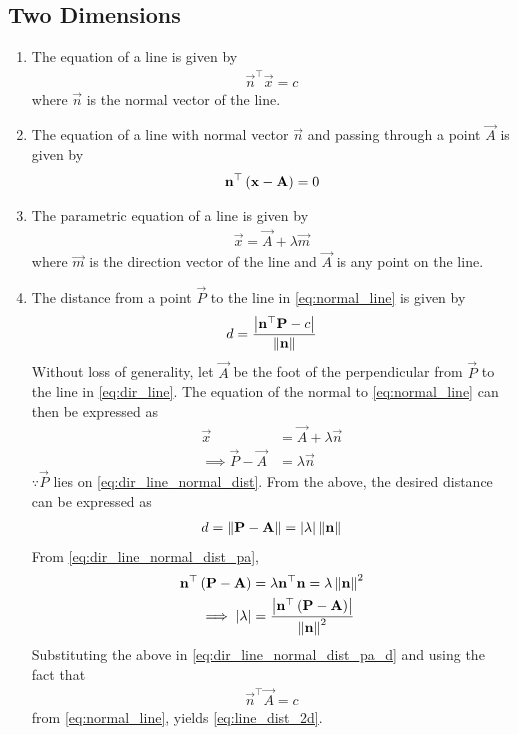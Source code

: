 \documentclass[journal,12pt,twocolumn]{IEEEtran}
\renewcommand\thesection{\arabic{section}}
\renewcommand\thesubsection{\thesection.\arabic{subsection}}
\begin{document}
\subsection{Two Dimensions}
\renewcommand{\theequation}{\theenumi}
\begin{enumerate}[label=\thesubsection.\arabic*.,ref=\thesubsection.\theenumi]
\item The equation of a line  is given by  
\begin{align}
	\label{eq:normal_line}
   \vec{n}^{\top}\vec{x} = c
\end{align}
		where $\vec{n}$ is the normal vector of the line.
	\item The equation of a line with normal vector $\vec{n}$ and passing through a point $\vec{A}$ 
		is given by 
\begin{align}
	\label{eq:normal_line_pt}
	\mathbf{n}^{\top}\left(\mathbf{x}-\mathbf{A}\right) =0 
\end{align}
\item The parametric equation of a line  is given by  
\begin{align}
	\label{eq:dir_line}
	\vec{x} = \vec{A} + \lambda \vec{m}
\end{align}
		where $\vec{m}$ is the direction vector of the line and $\vec{A}$ is any point on the line.
	\item The distance from a point $\vec{P}$ to the line  in 
	\eqref{eq:normal_line}
	is given by 
\begin{align}
	\label{eq:line_dist_2d}
	d = \frac{\left\vert   \mathbf{n}^{\top}\mathbf{P}-c \right\vert}{\left\lVert\mathbf{n}\right\rVert}	
\end{align}
		\solution Without loss of generality, let $\vec{A}$ be the foot of the perpendicular from $\vec{P}$ to the line in 
	\eqref{eq:dir_line}.  The equation of the normal to 
	\eqref{eq:normal_line} can then be expressed as 
\begin{align}
	\label{eq:dir_line_normal_dist}
	\vec{x} &= \vec{A} + \lambda \vec{n}
	\\
	\implies 
	\vec{P}- \vec{A} &=  \lambda \vec{n}
	\label{eq:dir_line_normal_dist_pa}
\end{align}
$\because \vec{P}$ lies on 
		\eqref{eq:dir_line_normal_dist}.
From the above, the desired distance can be expressed as 
\begin{align}
d = 	\left\lVert\mathbf{P}- \mathbf{A}\right\rVert= \left\vert\lambda\right\vert \left\lVert\mathbf{n}\right\rVert
	\label{eq:dir_line_normal_dist_pa_d}
\end{align}
From 
	\eqref{eq:dir_line_normal_dist_pa},
\begin{align}
	\mathbf{n}^{\top}
	\left(\mathbf{P}- \mathbf{A}\right) &=  \lambda \mathbf{n}^{\top}\mathbf{n} = \lambda\left\lVert\mathbf{n}\right\rVert^2
	\\
	\implies \left\vert\lambda\right\vert&= \frac{\left\vert\mathbf{n}^{\top}
	\left(\mathbf{P}- \mathbf{A}\right)\right\vert}{\left\lVert\mathbf{n}\right\rVert^2} 
\end{align}
	Substituting the above in \eqref{eq:dir_line_normal_dist_pa_d} and using 
	the fact that 
\begin{align}
   \vec{n}^{\top}\vec{A} = c
\end{align}
from 	\eqref{eq:normal_line}, yields 
	\eqref{eq:line_dist_2d}.


\end{enumerate}
\end{document}
